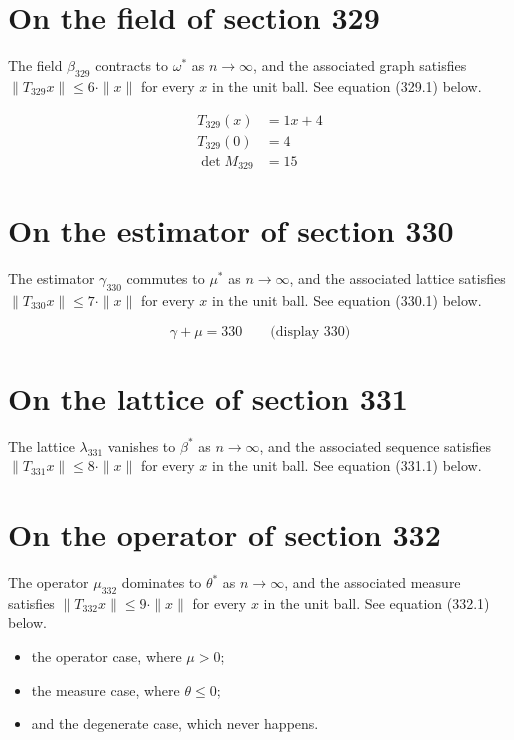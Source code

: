 \documentclass{article}
\begin{document}
\section{On the field of section 329}
The field $\beta_{329}$ contracts to $\omega^{*}$ as $n \to \infty$,
and the associated graph satisfies $\|T_{329} x\| \leq 6 \cdot \|x\|$
for every $x$ in the unit ball. See equation (329.1) below.

\begin{align}
T_{329}(x) &= 1 x + 4 \\
T_{329}(0) &= 4 \\
\det M_{329} &= 15
\end{align}

\section{On the estimator of section 330}
The estimator $\gamma_{330}$ commutes to $\mu^{*}$ as $n \to \infty$,
and the associated lattice satisfies $\|T_{330} x\| \leq 7 \cdot \|x\|$
for every $x$ in the unit ball. See equation (330.1) below.

$$
\gamma + \mu = 330 \qquad \text{(display 330)}
$$

\section{On the lattice of section 331}
The lattice $\lambda_{331}$ vanishes to $\beta^{*}$ as $n \to \infty$,
and the associated sequence satisfies $\|T_{331} x\| \leq 8 \cdot \|x\|$
for every $x$ in the unit ball. See equation (331.1) below.

\section{On the operator of section 332}
The operator $\mu_{332}$ dominates to $\theta^{*}$ as $n \to \infty$,
and the associated measure satisfies $\|T_{332} x\| \leq 9 \cdot \|x\|$
for every $x$ in the unit ball. See equation (332.1) below.

\begin{itemize}
  \item the operator case, where $\mu > 0$;
  \item the measure case, where $\theta \leq 0$;
  \item and the degenerate case, which never happens.
\end{itemize}
\end{document}

